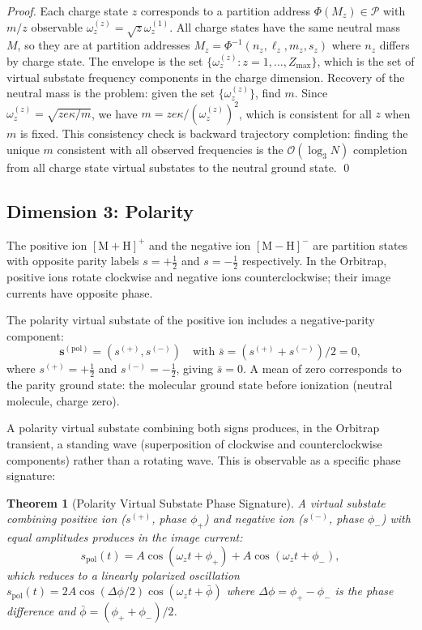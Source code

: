\documentclass[twocolumn,10pt,a4paper]{article}
\theoremstyle{thmstyle}
\newtheorem{theorem}{Theorem}[section]
\theoremstyle{definition}
\theoremstyle{remark}
\newcommand{\Parts}{\mathcal{P}}
\newcommand{\PhiMap}{\varPhi}
\begin{document}
\begin{proof}
Each charge state $z$ corresponds to a partition address
$\PhiMap(M_z) \in \Parts$ with $m/z$ observable $\omega_z^{(z)} = \sqrt{z}\omega_z^{(1)}$.
All charge states have the same neutral mass $M$, so they are at
partition addresses $M_{z} = \PhiMap^{-1}(n_z, \ell_z, m_z, s_z)$
where $n_z$ differs by charge state. The envelope is the set
$\{\omega_z^{(z)}: z = 1,\ldots,Z_{\max}\}$, which is the set of
virtual substate frequency components in the charge dimension.
Recovery of the neutral mass is the problem: given the set
$\{\omega_z^{(z)}\}$, find $m$. Since $\omega_z^{(z)} = \sqrt{ze\kappa/m}$,
we have $m = ze\kappa/(\omega_z^{(z)})^2$, which is consistent for
all $z$ when $m$ is fixed. This consistency check is backward trajectory
completion: finding the unique $m$ consistent with all observed
frequencies is the $\mathcal{O}(\log_3 N)$ completion from all charge
state virtual substates to the neutral ground state. \qed
\end{proof}

\subsection{Dimension 3: Polarity}

The positive ion $[\mathrm{M+H}]^+$ and the negative ion $[\mathrm{M-H}]^-$
are partition states with opposite parity labels $s = +\tfrac{1}{2}$
and $s = -\tfrac{1}{2}$ respectively. In the Orbitrap, positive ions
rotate clockwise and negative ions counterclockwise; their image currents
have opposite phase.

The polarity virtual substate of the positive ion includes a
negative-parity component:
\begin{equation}
\mathbf{s}^{(\text{pol})} = \left(s^{(+)}, s^{(-)}\right)
\quad \text{with } \bar{s} = (s^{(+)} + s^{(-)})/2 = 0,
\label{eq:polarity-vs}
\end{equation}
where $s^{(+)} = +\tfrac{1}{2}$ and $s^{(-)} = -\tfrac{1}{2}$, giving
$\bar{s} = 0$. A mean of zero corresponds to the parity ground state:
the molecular ground state before ionization (neutral molecule, charge zero).

A polarity virtual substate combining both signs produces, in the
Orbitrap transient, a standing wave (superposition of clockwise and
counterclockwise components) rather than a rotating wave. This is
observable as a specific phase signature:

\begin{theorem}[Polarity Virtual Substate Phase Signature]
\label{thm:polarity}
A virtual substate combining positive ion ($s^{(+)}$, phase $\phi_+$)
and negative ion ($s^{(-)}$, phase $\phi_-$) with equal amplitudes
produces in the image current:
\begin{equation}
s_{\mathrm{pol}}(t) = A\cos(\omega_z t + \phi_+) + A\cos(\omega_z t + \phi_-),
\label{eq:polarity-signal}
\end{equation}
which reduces to a linearly polarized oscillation
$s_{\mathrm{pol}}(t) = 2A\cos(\Delta\phi/2)\cos(\omega_z t + \bar{\phi})$
where $\Delta\phi = \phi_+ - \phi_-$ is the phase difference and
$\bar\phi = (\phi_++\phi_-)/2$.
\end{theorem}
\end{document}
